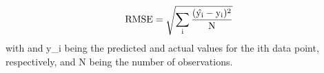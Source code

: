 $$\rm{RMSE}=\sqrt{\sum\limits_{i}\frac{(\hat{y_i}-y_i)^2}{N}}$$
with  and y_i being the predicted and actual values for the ith data point, respectively, and N being the number of observations.